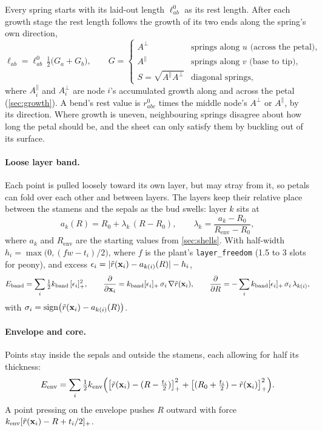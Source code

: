 Every spring starts with its laid-out length $\ell^0_{ab}$ as its rest length.
After each growth stage the rest length follows the growth of its two ends
along the spring's own direction,
\[
  \ell_{ab} = \ell^0_{ab}\,\tfrac12\bigl(G_a + G_b\bigr),
  \qquad
  G = \begin{cases} A^\perp & \text{springs along } u \text{ (across the petal)},\\
  A^\parallel & \text{springs along } v \text{ (base to tip)},\\
  S = \sqrt{A^\parallel A^\perp} & \text{diagonal springs,}\end{cases}
\]
where $A^\parallel_i$ and $A^\perp_i$ are node $i$'s accumulated growth along
and across the petal (\cref{sec:growth}). A bend's rest value is
$r^0_{abc}$ times the middle node's $A^\perp$ or $A^\parallel$, by its
direction. Where
growth is uneven, neighbouring springs disagree about how long the petal
should be, and the sheet can only satisfy them by buckling out of its surface.

\paragraph{Loose layer band.} Each point is pulled loosely toward its own
layer, but may stray from it, so petals can fold over each other and between
layers. The layers keep their relative place between the stamens and the
sepals as the bud swells: layer $k$ sits at
\[
  a_k(R) = R_0 + \lambda_k\,(R - R_0), \qquad \lambda_k = \frac{a_k - R_0}{R_{\mathrm{env}} - R_0},
\]
where $a_k$ and $R_{\mathrm{env}}$ are the starting values from
\cref{sec:shells}. With half-width $h_i = \max\bigl(0, (f w - t_i)/2\bigr)$,
where $f$ is the plant's \texttt{layer\_freedom} (1.5 to 3 slots for peony),
and excess $\epsilon_i = \lvert\tilde r(\mathbf{x}_i) - a_{k(i)}(R)\rvert - h_i$,
\[
  E_{\mathrm{band}} = \sum_i \tfrac12 k_{\mathrm{band}}\,[\epsilon_i]_+^2,
  \qquad
  \frac{\partial}{\partial \mathbf{x}_i} = k_{\mathrm{band}}[\epsilon_i]_+\,\sigma_i\,\nabla\tilde r(\mathbf{x}_i),
  \qquad
  \frac{\partial}{\partial R} = -\sum_i k_{\mathrm{band}}[\epsilon_i]_+\,\sigma_i\,\lambda_{k(i)},
\]
with $\sigma_i = \operatorname{sign}\bigl(\tilde r(\mathbf{x}_i) - a_{k(i)}(R)\bigr)$.

\paragraph{Envelope and core.} Points stay inside the sepals and outside the
stamens, each allowing for half its thickness:
\[
  E_{\mathrm{env}} = \sum_i \tfrac12 k_{\mathrm{env}}\Bigl(\bigl[\tilde r(\mathbf{x}_i) - (R - \tfrac{t_i}{2})\bigr]_+^2 + \bigl[(R_0 + \tfrac{t_i}{2}) - \tilde r(\mathbf{x}_i)\bigr]_+^2\Bigr).
\]
A point pressing on the envelope pushes $R$ outward with force
$k_{\mathrm{env}}[\tilde r(\mathbf{x}_i) - R + t_i/2]_+$.

